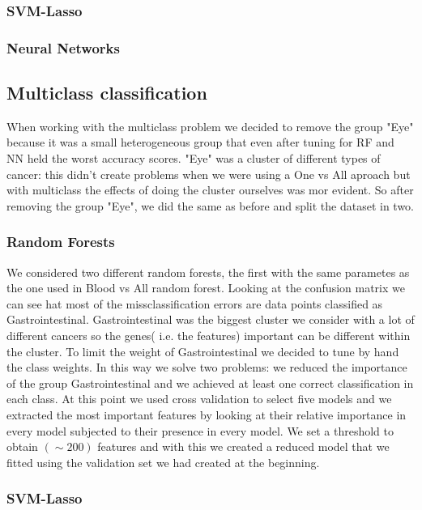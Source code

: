 \documentclass[a4paper,11pt, oneside]{article}  %
\begin{document}
	\subsubsection{SVM-Lasso}
	
	\subsubsection{Neural Networks}
	
	
	\subsection{Multiclass classification}
	When working with the multiclass problem we decided to remove the group "Eye" because it was a small heterogeneous group that even after tuning for RF and NN held the worst accuracy scores. "Eye" was a cluster of different types of cancer: this didn't create problems when we were using a One vs All aproach but with multiclass the effects of doing the cluster ourselves was mor evident.  
	So after removing the group "Eye", we did the same as before and split the dataset in two.
	
	\subsubsection{Random Forests}
	We considered two different random forests, the first with the same parametes as the one used in Blood vs All random forest. Looking at the confusion matrix we can see hat most of the missclassification errors are data points classified as Gastrointestinal. Gastrointestinal was the biggest cluster we consider with a lot of different cancers so the genes( i.e. the features) important can be different within the cluster. To limit the weight of Gastrointestinal we decided to tune by hand the class weights. In this way we solve two problems: we reduced the importance of the group Gastrointestinal and we achieved at least one correct classification in each class. At this point we used cross validation to select five models and we extracted the most important features by looking at their relative importance in every model subjected to their presence in every model. We set a threshold to obtain  $(\sim 200)$ features and with this we created a reduced model that we fitted using the validation set we had created at the beginning.
	\subsubsection{SVM-Lasso}
	
\end{document}
